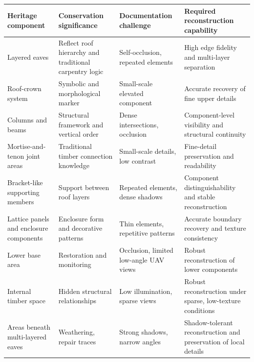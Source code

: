 \begin{longtable}[]{@{}
  >{\centering\arraybackslash}p{}
  >{\centering\arraybackslash}p{}
  >{\centering\arraybackslash}p{}
  >{\centering\arraybackslash}p{}@{}}
\toprule\noalign{}
\begin{minipage}[b]{\linewidth}\centering
\textbf{Heritage component}
\end{minipage} & \begin{minipage}[b]{\linewidth}\centering
\textbf{Conservation significance}
\end{minipage} & \begin{minipage}[b]{\linewidth}\centering
\textbf{Documentation challenge}
\end{minipage} & \begin{minipage}[b]{\linewidth}\centering
\textbf{Required reconstruction capability}
\end{minipage} \\
\midrule\noalign{}
\endhead
\bottomrule\noalign{}
\endlastfoot
Layered eaves & Reflect roof hierarchy and traditional
carpentry logic & Self-occlusion, repeated elements & High
edge fidelity and multi-layer separation \\
Roof-crown system & Symbolic and morphological marker &
Small-scale elevated component & Accurate recovery of fine
upper details \\
Columns and beams & Structural framework and vertical order &
Dense intersections, occlusion & Component-level visibility and
structural continuity \\
Mortise-and-tenon joint areas & Traditional timber connection
knowledge & Small-scale details, low contrast & Fine-detail
preservation and readability \\
Bracket-like supporting members & Support between roof layers
& Repeated elements, dense shadows & Component
distinguishability and stable reconstruction \\
Lattice panels and enclosure components & Enclosure form and
decorative patterns & Thin elements, repetitive patterns &
Accurate boundary recovery and texture consistency \\
Lower base area & Restoration and monitoring & Occlusion,
limited low-angle UAV views & Robust reconstruction of lower
components \\
Internal timber space & Hidden structural relationships &
Low illumination, sparse views & Robust reconstruction under
sparse, low-texture conditions \\
Areas beneath multi-layered eaves & Weathering, repair traces
& Strong shadows, narrow angles & Shadow-tolerant
reconstruction and preservation of local details \\
\end{longtable}


